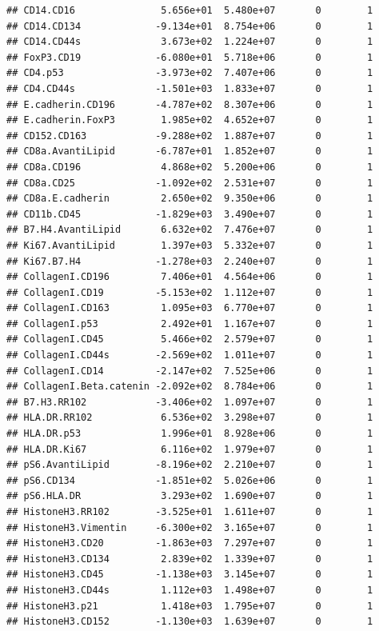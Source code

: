 \documentclass[a4paper]{article}\usepackage[]{graphicx}\usepackage[]{color}
\makeatletter
\newenvironment{kframe}{%
 \def\at@end@of@kframe{}%
 \ifinner\ifhmode%
  \def\at@end@of@kframe{\end{minipage}}%
  \begin{minipage}{\columnwidth}%
 \fi\fi%
 \def\FrameCommand##1{\hskip\@totalleftmargin \hskip-\fboxsep
 \colorbox{shadecolor}{##1}\hskip-\fboxsep
     \hskip-\linewidth \hskip-\@totalleftmargin \hskip\columnwidth}%
 \MakeFramed {\advance\hsize-\width
   \@totalleftmargin\z@ \linewidth\hsize
   \@setminipage}}%
 {\par\unskip\endMakeFramed%
 \at@end@of@kframe}
\newenvironment{knitrout}{}{} %
\makeatother
\begin{document}
\begin{knitrout}
\begin{kframe}
\begin{verbatim}
## CD14.CD16               5.656e+01  5.480e+07       0        1
## CD14.CD134             -9.134e+01  8.754e+06       0        1
## CD14.CD44s              3.673e+02  1.224e+07       0        1
## FoxP3.CD19             -6.080e+01  5.718e+06       0        1
## CD4.p53                -3.973e+02  7.407e+06       0        1
## CD4.CD44s              -1.501e+03  1.833e+07       0        1
## E.cadherin.CD196       -4.787e+02  8.307e+06       0        1
## E.cadherin.FoxP3        1.985e+02  4.652e+07       0        1
## CD152.CD163            -9.288e+02  1.887e+07       0        1
## CD8a.AvantiLipid       -6.787e+01  1.852e+07       0        1
## CD8a.CD196              4.868e+02  5.200e+06       0        1
## CD8a.CD25              -1.092e+02  2.531e+07       0        1
## CD8a.E.cadherin         2.650e+02  9.350e+06       0        1
## CD11b.CD45             -1.829e+03  3.490e+07       0        1
## B7.H4.AvantiLipid       6.632e+02  7.476e+07       0        1
## Ki67.AvantiLipid        1.397e+03  5.332e+07       0        1
## Ki67.B7.H4             -1.278e+03  2.240e+07       0        1
## CollagenI.CD196         7.406e+01  4.564e+06       0        1
## CollagenI.CD19         -5.153e+02  1.112e+07       0        1
## CollagenI.CD163         1.095e+03  6.770e+07       0        1
## CollagenI.p53           2.492e+01  1.167e+07       0        1
## CollagenI.CD45          5.466e+02  2.579e+07       0        1
## CollagenI.CD44s        -2.569e+02  1.011e+07       0        1
## CollagenI.CD14         -2.147e+02  7.525e+06       0        1
## CollagenI.Beta.catenin -2.092e+02  8.784e+06       0        1
## B7.H3.RR102            -3.406e+02  1.097e+07       0        1
## HLA.DR.RR102            6.536e+02  3.298e+07       0        1
## HLA.DR.p53              1.996e+01  8.928e+06       0        1
## HLA.DR.Ki67             6.116e+02  1.979e+07       0        1
## pS6.AvantiLipid        -8.196e+02  2.210e+07       0        1
## pS6.CD134              -1.851e+02  5.026e+06       0        1
## pS6.HLA.DR              3.293e+02  1.690e+07       0        1
## HistoneH3.RR102        -3.525e+01  1.611e+07       0        1
## HistoneH3.Vimentin     -6.300e+02  3.165e+07       0        1
## HistoneH3.CD20         -1.863e+03  7.297e+07       0        1
## HistoneH3.CD134         2.839e+02  1.339e+07       0        1
## HistoneH3.CD45         -1.138e+03  3.145e+07       0        1
## HistoneH3.CD44s         1.112e+03  1.498e+07       0        1
## HistoneH3.p21           1.418e+03  1.795e+07       0        1
## HistoneH3.CD152        -1.130e+03  1.639e+07       0        1

\end{verbatim}
\end{kframe}
\end{knitrout}
\end{document}
